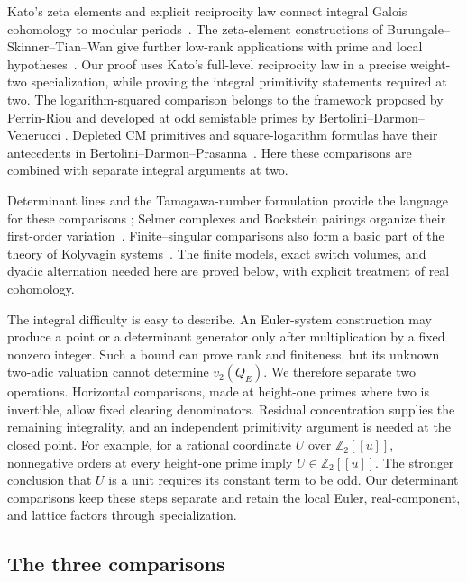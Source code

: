 Kato's zeta elements and explicit reciprocity law connect integral
Galois cohomology to modular periods~\cite{Kato04}. The zeta-element
constructions of Burungale--Skinner--Tian--Wan give further low-rank
applications with prime and local hypotheses~\cite{BSTW24}.
Our proof uses Kato's full-level reciprocity law in a precise
weight-two specialization, while proving the integral primitivity
statements required at two. The logarithm-squared comparison belongs
to the framework proposed by Perrin-Riou and developed at odd
semistable primes by Bertolini--Darmon--Venerucci
\cite{PerrinRiou1993,BertoliniDarmonVenerucci2022}. Depleted CM
primitives and square-logarithm formulas have their antecedents in
Bertolini--Darmon--Prasanna~\cite{BertoliniDarmonPrasanna2013}.
Here these comparisons are combined with separate integral arguments
at two.

Determinant lines and the Tamagawa-number
formulation provide the language for these comparisons
\cite{KnudsenMumford76,BlochKato90}; Selmer complexes and Bockstein
pairings organize their first-order variation~\cite{Nekovar06}.
Finite--singular comparisons also form a basic part of the theory of
Kolyvagin systems~\cite{MazurRubin04}. The finite models, exact
switch volumes, and dyadic alternation needed here are proved below,
with explicit treatment of real cohomology.

The integral difficulty is easy to describe.  An Euler-system
construction may produce a point or a determinant generator only after
multiplication by a fixed nonzero integer.  Such a bound can prove rank
and finiteness, but its unknown two-adic valuation cannot determine
\(v_2(Q_E)\).  We therefore separate two operations.  Horizontal
comparisons, made at height-one primes where two is invertible, allow
fixed clearing denominators. Residual concentration supplies the
remaining integrality, and an independent primitivity argument is
needed at the closed point. For example, for a rational coordinate
\(U\) over \(\mathbb Z_2[[u]]\), nonnegative orders at every
height-one prime imply \(U\in\mathbb Z_2[[u]]\). The stronger
conclusion that \(U\) is a unit requires its constant term to be odd.
Our determinant comparisons keep these steps separate and retain the
local Euler, real-component, and lattice factors through specialization.

\subsection{The three comparisons}

